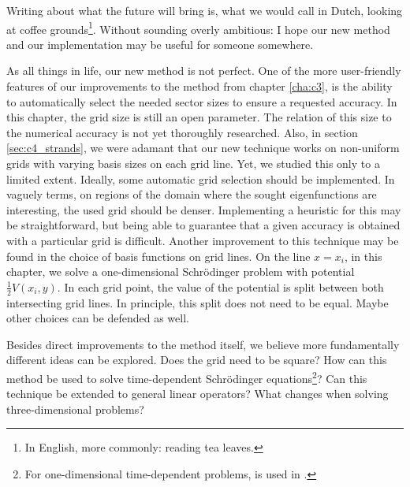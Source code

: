 Writing about what the future will bring is, what we would call in Dutch, looking at coffee grounds\footnote{In English, more commonly: reading tea leaves.}. Without sounding overly ambitious: I hope our new method and our implementation may be useful for someone somewhere.

As all things in life, our new method is not perfect. One of the more user-friendly features of our improvements to the method from chapter \ref{cha:c3}, is the ability to automatically select the needed sector sizes to ensure a requested accuracy. In this chapter, the grid size is still an open parameter. The relation of this size to the numerical accuracy is not yet thoroughly researched. Also, in section \ref{sec:c4_strands}, we were adamant that our new technique works on non-uniform grids with varying basis sizes on each grid line. Yet, we studied this only to a limited extent. Ideally, some automatic  grid selection should be implemented. In vaguely terms, on regions of the domain where the sought eigenfunctions are interesting, the used grid should be denser. Implementing a heuristic for this may be straightforward, but being able to guarantee that a given accuracy is obtained with a particular grid is difficult. Another improvement to this technique may be found in the choice of basis functions on grid lines. On the line $x = x_i$, in this chapter, we solve a one-dimensional Schrödinger problem with potential $\frac{1}{2} V(x_i, y)$. In each grid point, the value of the potential is split between both intersecting grid lines. In principle, this split does not need to be equal. Maybe other choices can be defended as well.

Besides direct improvements to the method itself, we believe more fundamentally different ideas can be explored. Does the grid need to be square? How can this method be used to solve time-dependent Schrödinger equations\footnote{For one-dimensional time-dependent problems,  is used in \cite{ledoux_accurate_2014}.}? Can this technique be extended to general linear operators? What changes when solving three-dimensional problems?

